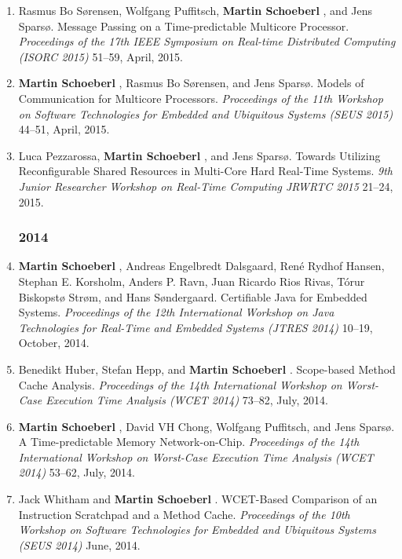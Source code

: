 \begin{enumerate}
\item Rasmus Bo S{\o}rensen, Wolfgang Puffitsch, {\bf Martin Schoeberl }, and Jens Spars{\o}.
 Message Passing on a Time-predictable Multicore Processor.
 \emph{Proceedings of the 17th IEEE Symposium on Real-time Distributed Computing (ISORC 2015)} 51--59, April, 2015.

\item {\bf Martin Schoeberl }, Rasmus Bo S{\o}rensen, and Jens Spars{\o}.
 Models of Communication for Multicore Processors.
 \emph{Proceedings of the 11th Workshop on Software Technologies for Embedded and Ubiquitous Systems (SEUS 2015)} 44--51, April, 2015.

\item Luca Pezzarossa, {\bf Martin Schoeberl }, and Jens Spars{\o}.
 Towards Utilizing Reconfigurable Shared Resources in Multi-Core Hard Real-Time Systems.
 \emph{9th Junior Researcher Workshop on Real-Time Computing JRWRTC 2015} 21--24, 2015.


\subsubsection*{2014}

\item {\bf Martin Schoeberl }, Andreas Engelbredt Dalsgaard, Ren\'{e} Rydhof Hansen, Stephan E. Korsholm, Anders P. Ravn, Juan Ricardo Rios Rivas, T\'{o}rur Biskopst{\o} Str{\o}m, and Hans S{\o}ndergaard.
 Certifiable Java for Embedded Systems.
 \emph{Proceedings of the 12th International Workshop on Java Technologies for Real-Time and Embedded Systems (JTRES 2014)} 10--19, October, 2014.

\item Benedikt Huber, Stefan Hepp, and {\bf Martin Schoeberl }.
 Scope-based Method Cache Analysis.
 \emph{Proceedings of the 14th International Workshop on Worst-Case Execution Time Analysis (WCET 2014)} 73--82, July, 2014.

\item {\bf Martin Schoeberl }, David VH Chong, Wolfgang Puffitsch, and Jens Spars{\o}.
 A Time-predictable Memory Network-on-Chip.
 \emph{Proceedings of the 14th International Workshop on Worst-Case Execution Time Analysis (WCET 2014)} 53--62, July, 2014.

\item Jack Whitham and {\bf Martin Schoeberl }.
 WCET-Based Comparison of an Instruction Scratchpad and a Method Cache.
 \emph{Proceedings of the 10th Workshop on Software Technologies for Embedded and Ubiquitous Systems (SEUS 2014)} June, 2014.


\end{enumerate}
